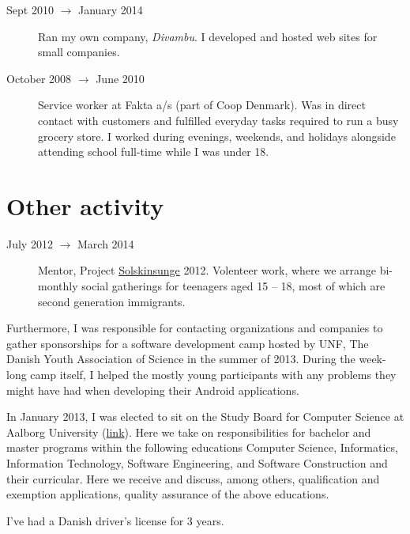 \documentclass[margin,line,a4paper]{resume}
\begin{document}
\begin{resume}
\begin{description}
  \item[Sept 2010 $\rightarrow$ January 2014] Ran my own company,
    \emph{Divambu}. I developed and hosted web sites for small companies.

  \item[October 2008 $\rightarrow$ June 2010] Service worker at
    Fakta a/s (part of Coop Denmark). Was in direct contact with customers
    and fulfilled everyday tasks required to run a busy grocery store. I
    worked during evenings, weekends, and holidays alongside attending
    school full-time while I was under 18.
\end{description}

\section{\mysidestyle Other activity}\vspace{1mm}
\begin{description}
  \item[July 2012 $\rightarrow$ March 2014] Mentor, Project
    \href{http://www.urk.dk/solskinsunge/}{Solskinsunge} 2012. Volenteer
    work, where we arrange bi-monthly social gatherings for teenagers aged
    15 -- 18, most of which are second generation immigrants.
\end{description}
Furthermore, I was responsible for contacting organizations and
companies to gather sponsorships for a software development camp hosted
by UNF, The Danish Youth Association of Science in the summer of 2013.
During the week-long camp itself, I helped the mostly young participants
with any problems they might have had when developing their Android
applications.

In January 2013, I was elected to sit on the Study
Board for Computer Science at Aalborg University
(\href{http://www.en.sict.aau.dk/Study+board+for+Computer+Science/}{link}).
Here we take on responsibilities for bachelor and master programs
within the following educations Computer Science, Informatics,
Information Technology, Software Engineering, and Software Construction
and their curricular. Here we receive and discuss, among others,
qualification and exemption applications, quality assurance of the above
educations.

I've had a Danish driver's license for $3$ years.


\end{resume}
\end{document}
